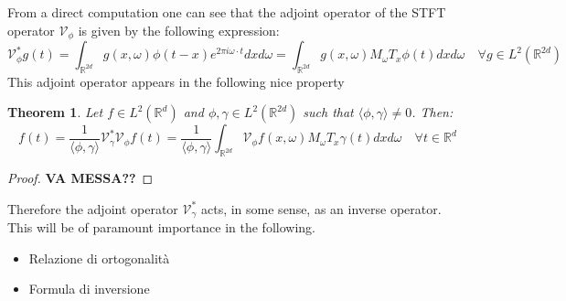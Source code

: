 \documentclass[corpo=11pt, stile=classica, tipotesi=custom,
greek, evenboxes, english]{toptesi}
\numberwithin{equation}{chapter}
\newtheorem{teo}{Theorem}[chapter] %
\newcommand{\R}{\mathbb{R}} %
\newcommand{\V}{\mathcal{V}} %
\begin{document}
From a direct computation one can see that the adjoint operator of the STFT operator $\V_{\phi}$ is given by the following expression:
\begin{equation}\label{STFT adjoint}
	\V_{\phi}^* g(t) = \int_{\R^{2d}} g(x,\omega) \phi(t-x) e^{2 \pi i \omega \cdot t} dxd\omega = \int_{\R^{2d}} g(x,\omega) M_{\omega}T_x \phi (t) dxd\omega\quad \forall g \in L^2(\R^{2d})
\end{equation}
This adjoint operator appears in the following nice property
\begin{teo}\label{inversion formula theorem}
	Let $f \in L^2(\R^d)$ and $\phi, \gamma \in L^2(\R^{2d})$ such that $\langle \phi, \gamma \rangle \neq 0$. Then:
	\begin{equation}\label{inversion formula}
		f(t) = \dfrac{1}{\langle \phi, \gamma \rangle} \V_{\gamma}^* \V_{\phi} f(t) = \dfrac{1}{\langle \phi, \gamma \rangle} \int_{\R^{2d}} \V_{\phi}f(x,\omega)M_{\omega}T_x \gamma (t) dxd\omega \quad \forall t \in \R^d
	\end{equation}
\end{teo}
\begin{proof}
	\textbf{VA MESSA??}
\end{proof}
Therefore the adjoint operator $\V_{\gamma}^*$ acts, in some sense, as an inverse operator. This will be of paramount importance in the following.
\begin{itemize}
	\item Relazione di ortogonalità
	\item Formula di inversione
\end{itemize}
\end{document}

